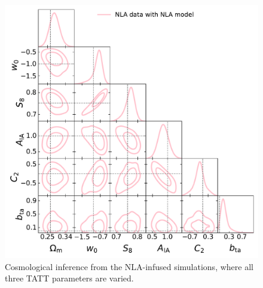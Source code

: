 \begin{figure}
\includegraphics[width=\columnwidth]{graphs/NLA_w0.pdf}
\caption{Cosmological inference from the NLA-infused simulations, where all three TATT parameters are varied.}
\label{fig:corner_nla_w0}
\end{figure}